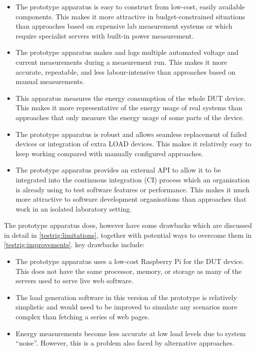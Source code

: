 \begin{itemize}
    \item The prototype apparatus is easy to construct from low-cost, easily available components. This makes it more attractive in budget-constrained situations than approaches based on expensive lab measurement systems or which require specialist servers with built-in power measurement.
    \item The prototype apparatus makes and logs multiple automated voltage and current measurements during a measurement run. This makes it more accurate, repeatable, and less labour-intensive than approaches based on manual measurements.
    \item This apparatus measures the energy consumption of the whole DUT device. This makes it more representative of the energy usage of real systems than approaches that only measure the energy usage of some parts of the device.
    \item The prototype apparatus is robust and allows seamless replacement of failed devices or integration of extra LOAD devices. This makes it relatively easy to keep working compared with manually configured approaches.
    \item The prototype apparatus provides an external API to allow it to be integrated into the \gls{continuous integration} (CI) process which an organisation is already using to test software features or performance. This makes it much more attractive to software development organisations than approaches that work in an isolated laboratory setting.
\end{itemize}

The prototype apparatus does, however have some drawbacks which are discussed in detail in \autoref{testrig:limitations}, together with potential ways to overcome them in \autoref{testrig:improvements}. key drawbacks include:

\begin{itemize}
\item The prototype apparatus uses a low-cost Raspberry Pi for the DUT device. This does not have the same processor, memory, or storage as many of the servers used to serve live web software.
\item The load generation software in this version of the prototype is relatively simplistic and would need to be improved to simulate any scenarios more complex than fetching a series of web pages.
\item Energy measurements become less accurate at low load levels due to system \enquote{noise}. However, this is a problem also faced by alternative approaches.
\end{itemize}

